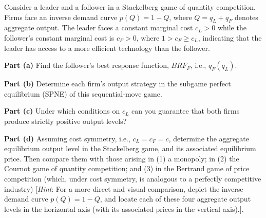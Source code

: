 Consider a leader and a follower in a Stackelberg game of quantity competition. Firms face an
inverse demand curve $p(Q) = 1 - Q$, where $Q = q_L + q_F$ denotes aggregate output. The leader faces
a constant marginal cost $c_L > 0$ while the follower's constant marginal cost is $c_F > 0$, where
$1 > c_F \ge c_L$, indicating that the leader has access to a more efficient technology than the
follower.

\textbf{Part (a)} Find the follower's best response function, $BRF_F$, i.e., $q_F(q_L)$.

\textbf{Part (b)} Determine each firm's output strategy in the subgame perfect equilibrium (SPNE) of
this sequential-move game.

\textbf{Part (c)} Under which conditions on $c_L$ can you guarantee that both firms produce strictly
positive output levels?

\textbf{Part (d)} Assuming cost symmetry, i.e., $c_L = c_F = c$, determine the aggregate equilibrium
output level in the Stackelberg game, and its associated equilibrium price. Then compare them with
those arising in (1) a monopoly; in (2) the Cournot game of quantity competition; and (3) in the
Bertrand game of price competition (which, under cost symmetry, is analogous to a perfectly
competitive industry) [\emph{Hint}: For a more direct and visual comparison, depict the inverse
demand curve $p(Q) = 1 - Q$, and locate each of these four aggregate output levels in the horizontal
axis (with its associated prices in the vertical axis).].
\resolespaco



